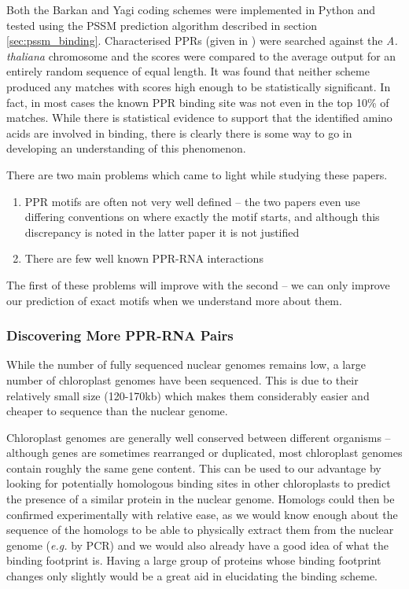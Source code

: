 Both the Barkan and Yagi coding schemes were implemented in Python and tested
using the PSSM prediction algorithm described in section
\ref{sec:pssm_binding}.
Characterised PPRs (given in \citet{Yagi2013}) were searched against the
\emph{A. thaliana} chromosome and the scores were compared to the average 
output for an entirely random sequence of equal length.
It was found that neither scheme produced any matches with scores high enough 
to be statistically significant.
In fact, in most cases the known PPR binding site was not even in the top 10\%
of matches.
While there is statistical evidence to support that the identified amino acids
are involved in binding, there is clearly there is some way to go in developing 
an understanding of this phenomenon.

There are two main problems which came to light while studying these papers.
\begin{enumerate}
  \item PPR motifs are often not very well defined -- the two papers even use
    differing conventions on where exactly the motif starts, and although this
    discrepancy is noted in the latter paper it is not justified
  \item There are few well known PPR-RNA interactions
\end{enumerate}
The first of these problems will improve with the second -- we can only improve
our prediction of exact motifs when we understand more about them.

\subsubsection{Discovering More PPR-RNA Pairs}

While the number of fully sequenced nuclear genomes remains low, a large 
number of chloroplast genomes have been sequenced.
This is due to their relatively small size (120-170kb) which makes them
considerably easier and cheaper to sequence than the nuclear genome.

Chloroplast genomes are generally well conserved between different organisms --
although genes are sometimes rearranged or duplicated, most chloroplast genomes
contain roughly the same gene content.
This can be used to our advantage by looking for potentially homologous binding
sites in other chloroplasts to predict the presence of a similar protein in 
the nuclear genome.
Homologs could then be confirmed experimentally with relative ease, as we would 
know enough about the sequence of the homologs to be able to physically extract 
them from 
the nuclear genome (\emph{e.g.} by PCR) and we would also already have a good 
idea of what the binding footprint is.
Having a large group of proteins whose binding footprint changes only slightly
would be a great aid in elucidating the binding scheme.

